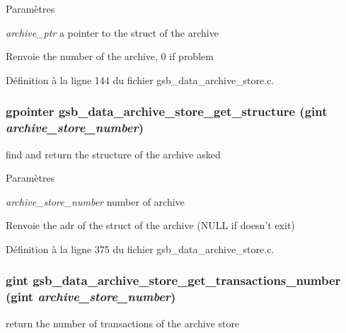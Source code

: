 \begin{DoxyParams}{Paramètres}
\item[{\em archive\_\-ptr}]a pointer to the struct of the archive\end{DoxyParams}
\begin{DoxyReturn}{Renvoie}
the number of the archive, 0 if problem 
\end{DoxyReturn}


Définition à la ligne 144 du fichier gsb\_\-data\_\-archive\_\-store.c.

\subsubsection[{gsb\_\-data\_\-archive\_\-store\_\-get\_\-structure}]{\setlength{\rightskip}{0pt plus 5cm}gpointer gsb\_\-data\_\-archive\_\-store\_\-get\_\-structure (gint {\em archive\_\-store\_\-number})}\label{gsb__data__archive__store_8h_a8f4e543de3ce18287a65f5451d7ba874}
find and return the structure of the archive asked


\begin{DoxyParams}{Paramètres}
\item[{\em archive\_\-store\_\-number}]number of archive\end{DoxyParams}
\begin{DoxyReturn}{Renvoie}
the adr of the struct of the archive (NULL if doesn't exit) 
\end{DoxyReturn}


Définition à la ligne 375 du fichier gsb\_\-data\_\-archive\_\-store.c.

\subsubsection[{gsb\_\-data\_\-archive\_\-store\_\-get\_\-transactions\_\-number}]{\setlength{\rightskip}{0pt plus 5cm}gint gsb\_\-data\_\-archive\_\-store\_\-get\_\-transactions\_\-number (gint {\em archive\_\-store\_\-number})}\label{gsb__data__archive__store_8h_a7e6138f285a9614074ba5b29e02cccdd}
return the number of transactions of the archive store


